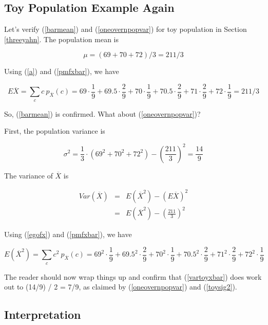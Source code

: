 \subsection{Toy Population Example Again}

Let's verify (\ref{barmean}) and (\ref{oneovernpopvar}) for toy
population in Section \ref{threeyahn}.  The population mean is

\begin{equation}
\mu = (69+70+72) / 3 = 211/3
\end{equation}

Using (\ref{a}) and (\ref{pmfxbar}), we have

\begin{equation}
E\overline{X} = \sum_{c} c ~ p_{\overline{X}}(c) =
69 \cdot \frac{1}{9} +
69.5 \cdot \frac{2}{9} +
70 \cdot \frac{1}{9} +
70.5 \cdot \frac{2}{9} +
71 \cdot \frac{2}{9} +
72 \cdot \frac{1}{9} = 211/3
\end{equation}

So, (\ref{barmean}) is confirmed.  What about (\ref{oneovernpopvar})?

First, the population variance is

\begin{equation}
\label{toysig2}
\sigma^2 = \frac{1}{3} \cdot (69^2+70^2+72^2) - (\frac{211}{3})^2 =
\frac{14}{9}
\end{equation}

The variance of $\overline{X}$ is

\begin{eqnarray}
\label{vartoyxbar}
Var(\overline{X})
&=& E(\overline{X}^2) - (E\overline{X})^2 \\
&=& E(\overline{X}^2) - (\frac{211}{3})^2 
\end{eqnarray}

Using (\ref{egofx}) and (\ref{pmfxbar}), we have

\begin{equation}
E(\overline{X}^2) = \sum_{c} c^2 ~ p_{\overline{X}}(c) =
69^2 \cdot \frac{1}{9} +
69.5^2 \cdot \frac{2}{9} +
70^2 \cdot \frac{1}{9} +
70.5^2 \cdot \frac{2}{9} +
71^2 \cdot \frac{2}{9} +
72^2 \cdot \frac{1}{9} 
\end{equation}

The reader should now wrap things up and  confirm that (\ref{vartoyxbar})
does work out to (14/9) / 2 = 7/9, as claimed by (\ref{oneovernpopvar})
and (\ref{toysig2}).

\subsection{Interpretation}

